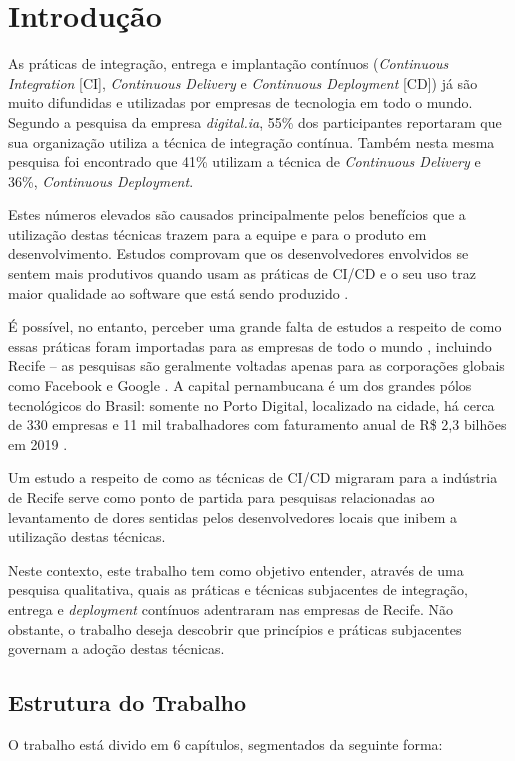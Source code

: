
\chapter{Introdução}

As práticas de integração, entrega e implantação contínuos \cite{fowlerCI, fowlerCD} (\emph{Continuous Integration} [CI], \emph{Continuous Delivery} e \emph{Continuous Deployment} [CD]) já são muito difundidas e utilizadas por empresas de tecnologia em todo o mundo. Segundo a pesquisa da empresa \emph{digital.ia}\cite{stateAgileReport2020}, 55\% dos participantes reportaram que sua organização utiliza a técnica de integração contínua. Também nesta mesma pesquisa foi encontrado que 41\% utilizam a técnica de \emph{Continuous Delivery} e 36\%, \emph{Continuous Deployment}.

Estes números elevados são causados principalmente pelos benefícios que a utilização destas técnicas trazem para a equipe e para o produto em desenvolvimento. Estudos comprovam que os desenvolvedores envolvidos se sentem mais produtivos quando usam as práticas de CI/CD \cite{hilton2016} e o seu uso traz maior qualidade ao software que está sendo produzido \cite{savor2015}. 

É possível, no entanto, perceber uma grande falta de estudos a respeito de como essas práticas foram importadas para as empresas de todo o mundo \cite{empiricalStudy2016}, incluindo Recife -- as pesquisas são geralmente voltadas apenas para as corporações globais como Facebook \cite{savor2015} e Google \cite{googleCi}. A capital pernambucana é um dos grandes pólos tecnológicos do Brasil: somente no Porto Digital, localizado na cidade, há cerca de 330 empresas e 11 mil trabalhadores com faturamento anual de R\$ 2,3 bilhões em 2019 \cite{portoDigital}.

Um estudo a respeito de como as técnicas de CI/CD migraram para a indústria de Recife serve como ponto de partida para pesquisas relacionadas ao levantamento de dores sentidas pelos desenvolvedores locais que inibem a utilização destas técnicas.

Neste contexto, este trabalho tem como objetivo entender, através de uma pesquisa qualitativa, quais as práticas e técnicas subjacentes de integração, entrega e \emph{deployment} contínuos adentraram nas empresas de Recife. Não obstante, o trabalho deseja descobrir que princípios e práticas subjacentes governam a adoção destas técnicas.

\section{Estrutura do Trabalho}
 O trabalho está divido em 6 capítulos, segmentados da seguinte forma:

